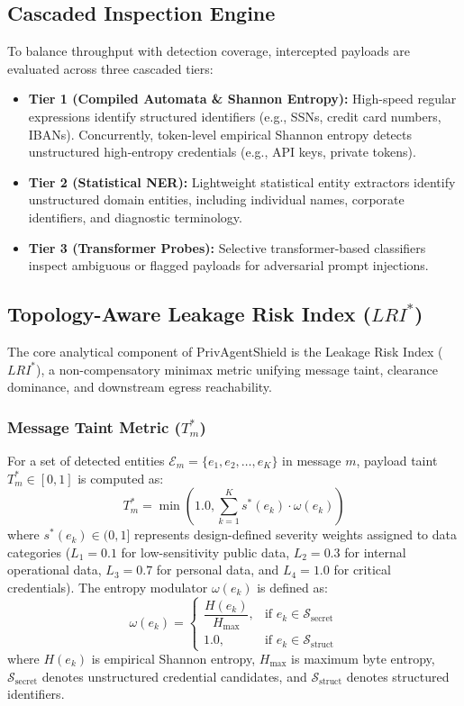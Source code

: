 \documentclass[conference]{IEEEtran}
\begin{document}
\subsection{Cascaded Inspection Engine}
To balance throughput with detection coverage, intercepted payloads are evaluated across three cascaded tiers:
\begin{itemize}
    \item \textbf{Tier 1 (Compiled Automata \& Shannon Entropy):} High-speed regular expressions identify structured identifiers (e.g., SSNs, credit card numbers, IBANs). Concurrently, token-level empirical Shannon entropy detects unstructured high-entropy credentials (e.g., API keys, private tokens).
    \item \textbf{Tier 2 (Statistical NER):} Lightweight statistical entity extractors identify unstructured domain entities, including individual names, corporate identifiers, and diagnostic terminology.
    \item \textbf{Tier 3 (Transformer Probes):} Selective transformer-based classifiers inspect ambiguous or flagged payloads for adversarial prompt injections.
\end{itemize}

\subsection{Topology-Aware Leakage Risk Index ($LRI^*$)}
The core analytical component of PrivAgentShield is the Leakage Risk Index ($LRI^*$), a non-compensatory minimax metric unifying message taint, clearance dominance, and downstream egress reachability.

\subsubsection{Message Taint Metric ($T^*_m$)}
For a set of detected entities $\mathcal{E}_m = \{e_1, e_2, \dots, e_K\}$ in message $m$, payload taint $T^*_m \in [0, 1]$ is computed as:
\begin{equation}
T^*_m = \min \left( 1.0, \sum_{k=1}^K s^*(e_k) \cdot \omega(e_k) \right)
\end{equation}
where $s^*(e_k) \in (0, 1]$ represents design-defined severity weights assigned to data categories ($L_1 = 0.1$ for low-sensitivity public data, $L_2 = 0.3$ for internal operational data, $L_3 = 0.7$ for personal data, and $L_4 = 1.0$ for critical credentials). The entropy modulator $\omega(e_k)$ is defined as:
\begin{equation}
\omega(e_k) = \begin{cases} 
\dfrac{H(e_k)}{H_{\max}}, & \text{if } e_k \in \mathcal{S}_{\text{secret}} \\ 
1.0, & \text{if } e_k \in \mathcal{S}_{\text{struct}} 
\end{cases}
\end{equation}
where $H(e_k)$ is empirical Shannon entropy, $H_{\max}$ is maximum byte entropy, $\mathcal{S}_{\text{secret}}$ denotes unstructured credential candidates, and $\mathcal{S}_{\text{struct}}$ denotes structured identifiers.
\end{document}
